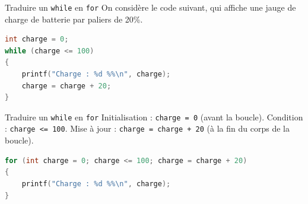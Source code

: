 \begin{UPSTIexercice}{Traduire un \texttt{while} en \texttt{for}}
    On considère le code suivant, qui affiche une jauge de charge de batterie par paliers de 20\%.
    \begin{lstlisting}[language=C]
int charge = 0;
while (charge <= 100)
{
    printf("Charge : %d %%\n", charge);
    charge = charge + 20;
}
\end{lstlisting}
\end{UPSTIexercice}

\begin{UPSTIprofOnlyEnv}
    \begin{UPSTIcorrectionP}{Traduire un \texttt{while} en \texttt{for}}
        Initialisation : \texttt{charge = 0} (avant la boucle). Condition : \texttt{charge <= 100}. Mise à jour : \texttt{charge = charge + 20} (à la fin du corps de la boucle).
        \begin{lstlisting}[language=C]
for (int charge = 0; charge <= 100; charge = charge + 20)
{
    printf("Charge : %d %%\n", charge);
}
\end{lstlisting}
    \end{UPSTIcorrectionP}
\end{UPSTIprofOnlyEnv}
